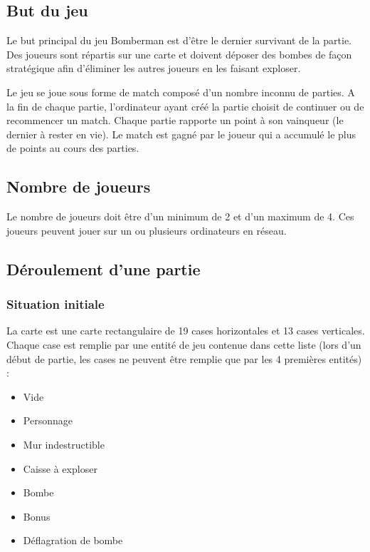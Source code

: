 \subsection{But du jeu}

Le but principal du jeu Bomberman est d'être le dernier survivant de la partie. Des joueurs sont répartis sur une carte et doivent déposer des bombes de façon stratégique afin d'éliminer les autres joueurs en les faisant exploser.

Le jeu se joue sous forme de match composé d'un nombre inconnu de parties. A la fin de chaque partie, l'ordinateur ayant créé la partie choisit de continuer ou de recommencer un match. Chaque partie rapporte un point à son vainqueur (le dernier à rester en vie). Le match est gagné par le joueur qui a accumulé le plus de points au cours des parties.

\subsection{Nombre de joueurs}

Le nombre de joueurs doit être d'un minimum de 2 et d'un maximum de 4. Ces joueurs peuvent jouer sur un ou plusieurs ordinateurs en réseau.

\subsection{Déroulement d'une partie}

\subsubsection{Situation initiale}

La carte est une carte rectangulaire de 19 cases horizontales et 13 cases verticales. Chaque case est remplie par une entité de jeu contenue dans cette liste (lors d'un début de partie, les cases ne peuvent être remplie que par les 4 premières entités) :

\begin{itemize}
    \item Vide
    \item Personnage
    \item Mur indestructible
    \item Caisse à exploser
    \item Bombe
    \item Bonus
    \item Déflagration de bombe
\end{itemize}

